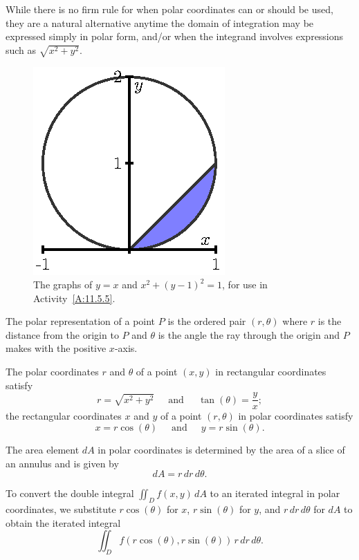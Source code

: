 While there is no firm rule for when polar coordinates can or should be used, they are a natural alternative anytime the domain of integration may be expressed simply in polar form, and/or when the integrand involves expressions such as $\sqrt{x^2 + y^2}.$



\begin{figure}[ht]
\begin{center}
  \includegraphics{figures/fig_11_5_polar_region.eps}
\end{center}
\caption{The graphs of $y=x$ and $x^2 + (y-1)^2 = 1$, for use in Activity~\ref{A:11.5.5}.}
\label{F:11.5.Polar_exercise}
\end{figure}

\newpage




\begin{summary}
\item The polar representation of a point $P$ is the ordered pair $(r,\theta)$ where $r$ is the distance from the origin to $P$ and $\theta$ is the angle the ray through the origin and $P$ makes with the positive $x$-axis.
\item The polar coordinates $r$ and $\theta$ of a point $(x,y)$ in rectangular coordinates satisfy
\[r = \sqrt{x^2+y^2} \ \ \ \ \ \text{ and } \ \ \ \ \ \tan(\theta) = \frac{y}{x};\]
the rectangular coordinates $x$ and $y$ of a point $(r,\theta)$ in polar coordinates satisfy
\[x = r\cos(\theta)  \ \ \ \ \ \text{ and } \ \ \ \ \ y = r\sin(\theta).\]
\item The area element $dA$ in polar coordinates is determined by the area of a slice of an annulus and is given by
\[dA = r \, dr \, d\theta.\]
\item To convert the double integral ${\iint_D f(x,y) \, dA}$ to an iterated integral in polar coordinates, we substitute $r \cos(\theta)$ for $x$, $r \sin(\theta)$ for $y$, and $r \, dr \, d\theta$ for $dA$ to obtain the iterated integral 
\[{\iint_D f(r\cos(\theta), r\sin(\theta)) \, r \, dr \, d\theta}.\]
\end{summary}

\nin \hrulefill



\clearpage
